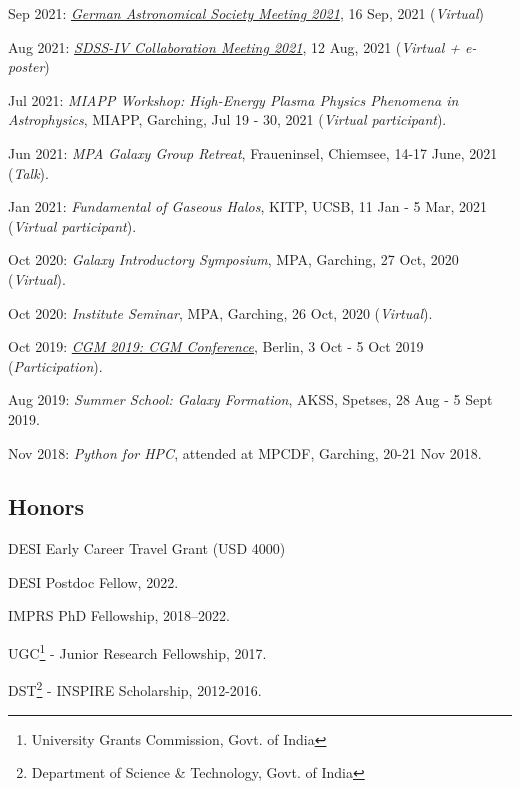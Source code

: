 \documentclass[12pt,letterpaper]{article}
\newcommand{\as}{*}
\begin{document}
\begin{list}{}{\cvlist}
\item Sep 2021:  \emph{\href{https://ag2021.astronomische-gesellschaft.de/view_splinter.php?session=Stars}{German Astronomical Society Meeting 2021}}, 16 Sep, 2021 (\textit{Virtual})   
\item Aug 2021:  \emph{\href{https://jhu2021.sdss.org/}{SDSS-IV Collaboration Meeting 2021}}, 12 Aug, 2021 (\textit{Virtual + e-poster})   
\item \as Jul 2021:  \emph{MIAPP Workshop: High-Energy Plasma Physics Phenomena in Astrophysics}, MIAPP, Garching, Jul 19 - 30, 2021 (\textit{Virtual participant}).  

\item Jun 2021:  \emph{MPA Galaxy Group Retreat}, Fraueninsel, Chiemsee, 14-17 June, 2021 (\textit{Talk}).  
\item \as Jan 2021:  \emph{Fundamental of Gaseous Halos}, KITP, UCSB, 11 Jan - 5 Mar, 2021 (\textit{Virtual participant}).  
\item Oct 2020:  \emph{Galaxy Introductory Symposium}, MPA, Garching, 27 Oct, 2020 (\textit{Virtual}).  
\item Oct 2020:  \emph{Institute Seminar}, MPA, Garching, 26 Oct, 2020 (\textit{Virtual}).  

\item Oct 2019:  \emph{\href{https://wwwmpa.mpa-garching.mpg.de/conf/berlincgm2019/}{CGM 2019: CGM Conference}}, Berlin, 3 Oct - 5 Oct 2019 (\textit{Participation}).  
\item \as Aug 2019:  \emph{Summer School: Galaxy Formation}, AKSS, Spetses, 28 Aug - 5 Sept 2019.  
\item \as Nov 2018:  \emph{Python for HPC}, attended at MPCDF, Garching, 20-21 Nov 2018.  

\end{list}

\subsection{Honors}
\begin{list}{}{\cvlist}
  \item DESI Early Career Travel Grant (USD 4000)
  \item DESI Postdoc Fellow, 2022.
  \item IMPRS PhD Fellowship, 2018--2022.
  \item UGC\footnote{University Grants Commission, Govt. of India} - Junior Research Fellowship, 2017.
  \item DST\footnote{Department of Science \& Technology, Govt. of India} - INSPIRE Scholarship, 2012-2016.

\end{list}
\end{document}
